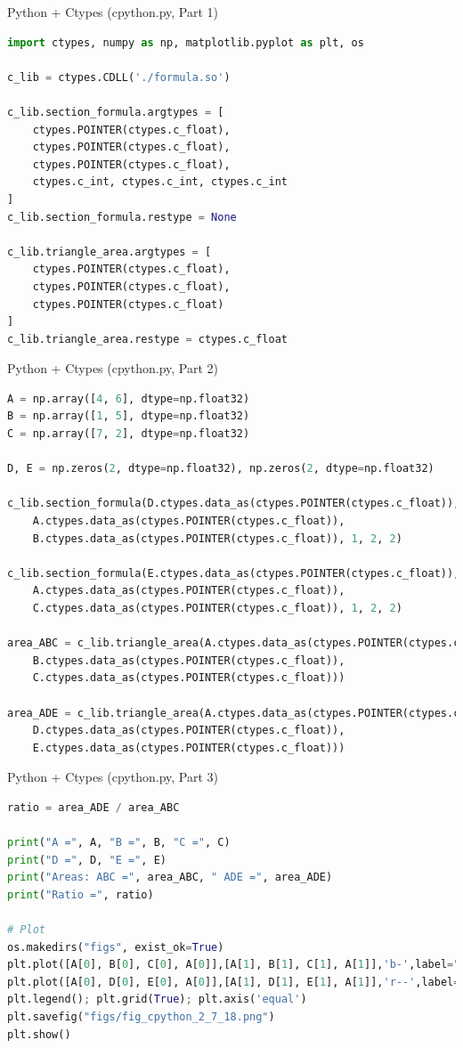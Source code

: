 \documentclass{beamer}
\begin{document}
\begin{frame}[fragile]{Python + Ctypes (cpython.py, Part 1)}
\begin{lstlisting}[language=Python]
import ctypes, numpy as np, matplotlib.pyplot as plt, os

c_lib = ctypes.CDLL('./formula.so')

c_lib.section_formula.argtypes = [
    ctypes.POINTER(ctypes.c_float),
    ctypes.POINTER(ctypes.c_float),
    ctypes.POINTER(ctypes.c_float),
    ctypes.c_int, ctypes.c_int, ctypes.c_int
]
c_lib.section_formula.restype = None

c_lib.triangle_area.argtypes = [
    ctypes.POINTER(ctypes.c_float),
    ctypes.POINTER(ctypes.c_float),
    ctypes.POINTER(ctypes.c_float)
]
c_lib.triangle_area.restype = ctypes.c_float
\end{lstlisting}
\end{frame}

\begin{frame}[fragile]{Python + Ctypes (cpython.py, Part 2)}
\begin{lstlisting}[language=Python]
A = np.array([4, 6], dtype=np.float32)
B = np.array([1, 5], dtype=np.float32)
C = np.array([7, 2], dtype=np.float32)

D, E = np.zeros(2, dtype=np.float32), np.zeros(2, dtype=np.float32)

c_lib.section_formula(D.ctypes.data_as(ctypes.POINTER(ctypes.c_float)),
    A.ctypes.data_as(ctypes.POINTER(ctypes.c_float)),
    B.ctypes.data_as(ctypes.POINTER(ctypes.c_float)), 1, 2, 2)

c_lib.section_formula(E.ctypes.data_as(ctypes.POINTER(ctypes.c_float)),
    A.ctypes.data_as(ctypes.POINTER(ctypes.c_float)),
    C.ctypes.data_as(ctypes.POINTER(ctypes.c_float)), 1, 2, 2)

area_ABC = c_lib.triangle_area(A.ctypes.data_as(ctypes.POINTER(ctypes.c_float)),
    B.ctypes.data_as(ctypes.POINTER(ctypes.c_float)),
    C.ctypes.data_as(ctypes.POINTER(ctypes.c_float)))

area_ADE = c_lib.triangle_area(A.ctypes.data_as(ctypes.POINTER(ctypes.c_float)),
    D.ctypes.data_as(ctypes.POINTER(ctypes.c_float)),
    E.ctypes.data_as(ctypes.POINTER(ctypes.c_float)))
\end{lstlisting}
\end{frame}

\begin{frame}[fragile]{Python + Ctypes (cpython.py, Part 3)}
\begin{lstlisting}[language=Python]
ratio = area_ADE / area_ABC

print("A =", A, "B =", B, "C =", C)
print("D =", D, "E =", E)
print("Areas: ABC =", area_ABC, " ADE =", area_ADE)
print("Ratio =", ratio)

# Plot
os.makedirs("figs", exist_ok=True)
plt.plot([A[0], B[0], C[0], A[0]],[A[1], B[1], C[1], A[1]],'b-',label="ΔABC")
plt.plot([A[0], D[0], E[0], A[0]],[A[1], D[1], E[1], A[1]],'r--',label="ΔADE")
plt.legend(); plt.grid(True); plt.axis('equal')
plt.savefig("figs/fig_cpython_2_7_18.png")
plt.show()
\end{lstlisting}
\end{frame}
\end{document}
